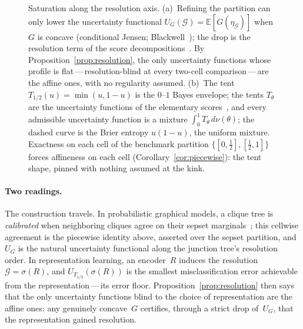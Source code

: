 \documentclass{article}
\theoremstyle{plain}
\theoremstyle{definition}
\newcommand{\E}{\mathbb{E}}
\begin{document}
\begin{figure}[ht]
{%
}
\caption{Saturation along the resolution axis. (a)~Refining the
partition can only lower the uncertainty functional
$U_G(\mathcal{G})=\E[G(\eta_{\mathcal{G}})]$ when $G$ is concave
(conditional Jensen; Blackwell~\cite{Blackwell1953}); the drop is the
resolution term of the score
decompositions~\cite{Murphy1973,Brocker2009,DGJ2021}. By
Proposition~\ref{prop:resolution}, the only uncertainty functions
whose profile is flat\,---\,resolution-blind at every two-cell
comparison\,---\,are the affine ones, with no regularity assumed.
(b)~The tent $T_{1/2}(u)=\min(u,1-u)$ is the $0$--$1$ Bayes envelope;
the tents $T_\theta$ are the uncertainty functions of the elementary
scores~\cite{Schervish1989,EGJK2016}, and every admissible
uncertainty function is a mixture $\int_0^1 T_\theta\,d\nu(\theta)$;
the dashed curve is the Brier entropy $u(1-u)$, the uniform mixture.
Exactness on each cell of the benchmark partition
$\{[0,\tfrac12],[\tfrac12,1]\}$ forces affineness on each cell
(Corollary~\ref{cor:piecewise}): the tent shape, pinned with nothing
assumed at the kink.}
\label{fig:resolution}
\end{figure}

\paragraph{Two readings.}
The construction travels. In probabilistic graphical models, a clique
tree is \emph{calibrated} when neighboring cliques agree on their
sepset marginals~\cite{KollerFriedman2009}; this cellwise agreement
is the piecewise identity above, asserted over the sepset partition,
and $U_G$ is the natural uncertainty functional along the junction
tree's resolution order. In representation learning, an encoder~$R$
induces the resolution $\mathcal{G}=\sigma(R)$, and
$U_{T_{1/2}}(\sigma(R))$ is the smallest misclassification error
achievable from the representation\,---\,its error floor.
Proposition~\ref{prop:resolution} then says that the only uncertainty
functions blind to the choice of representation are the affine ones:
any genuinely concave~$G$ certifies, through a strict drop of~$U_G$,
that the representation gained resolution.
\end{document}
